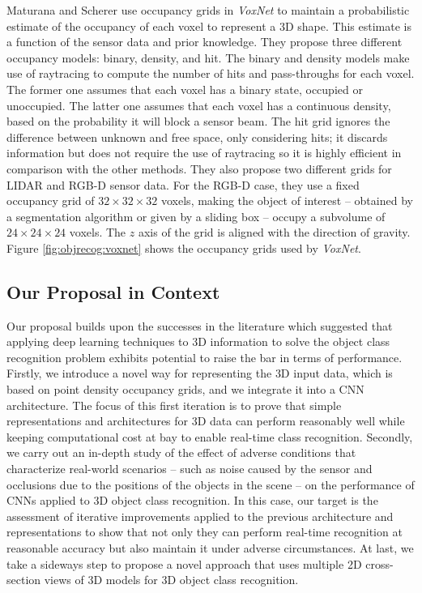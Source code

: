 Maturana and Scherer \cite{Maturana2015} use occupancy grids in \emph{VoxNet} to maintain a probabilistic estimate of the occupancy of each voxel to represent a \acs{3D} shape. This estimate is a function of the sensor data and prior knowledge. They propose three different occupancy models: binary, density, and hit. The binary and density models make use of raytracing to compute the number of hits and pass-throughs for each voxel. The former one assumes that each voxel has a binary state, occupied or unoccupied. The latter one assumes that each voxel has a continuous density, based on the probability it will block a sensor beam. The hit grid ignores the difference between unknown and free space, only considering hits; it discards information but does not require the use of raytracing so it is highly efficient in comparison with the other methods. They also propose two different grids for \ac{LIDAR} and \acs{RGB-D} sensor data. For the \acs{RGB-D} case, they use a fixed occupancy grid of $32\times32\times32$ voxels, making the object of interest -- obtained by a segmentation algorithm or given by a sliding box -- occupy a subvolume of $24\times24\times24$ voxels. The $z$ axis of the grid is aligned with the direction of gravity. Figure \ref{fig:objrecog:voxnet} shows the occupancy grids used by \emph{VoxNet}.

\subsection{Our Proposal in Context}
\label{cha:objrecog:sec:relatedworks:subsec:context}

Our proposal builds upon the successes in the literature which suggested that applying deep learning techniques to 3D information to solve the object class recognition problem exhibits potential to raise the bar in terms of performance. Firstly, we introduce a novel way for representing the \ac{3D} input data, which is based on point density occupancy grids, and we integrate it into a \ac{CNN} architecture. The focus of this first iteration is to prove that simple representations and architectures for 3D data can perform reasonably well while keeping computational cost at bay to enable real-time class recognition. Secondly, we carry out an in-depth study of the effect of adverse conditions that characterize real-world scenarios -- such as noise caused by the sensor and occlusions due to the positions of the objects in the scene -- on the performance of \acp{CNN} applied to \acs{3D} object class recognition. In this case, our target is the assessment of iterative improvements applied to the previous architecture and representations to show that not only they can perform real-time recognition at reasonable accuracy but also maintain it under adverse circumstances. At last, we take a sideways step to propose a novel approach that uses multiple \ac{2D} cross-section views of \ac{3D} models for 3D object class recognition.

